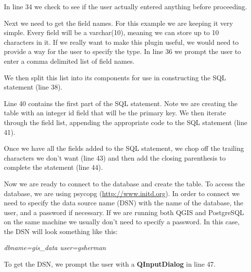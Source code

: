 In line 34 we check to see if the user actually entered anything before 
proceeding.

Next we need to get the field names. For this example we are keeping it very 
simple. Every field will be a varchar(10), meaning we can store up to 10 
characters in it. If we really want to make this plugin useful, we would need 
to provide a way for the user to specify the type. In line 36 we 
prompt the user to enter a comma delimited list of field names. 


We then split this list into its components for use in constructing the SQL 
statement (line 38). 

Line 40 contains the first part of the SQL statement. Note we are 
creating the table with an integer id field that will be the primary key. We 
then iterate through the field list, appending the appropriate code to the 
SQL statement (line 41).

Once we have all the fields added to the SQL statement, we chop off the 
trailing characters we don't want (line 43) and then add 
the closing parenthesis to complete the statement (line 44).

Now we are ready to connect to the database and create the table. To access 
the database, we are using psycopg (\url{http://www.initd.org}). In order 
to connect we need to specify the data source name (DSN) with the name of 
the database, the user, and a password if necessary. If we are running both 
QGIS and PostgreSQL on the same machine we usually don't need to specify a 
password. In this case, the DSN will look something like this:

\begin{center}
  \textsl{dbname=gis\_data user=gsherman}
\end{center}

To get the DSN, we prompt the user with a \textbf{QInputDialog} in line 47.


